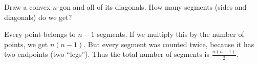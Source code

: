 \begin{exl}
Draw a convex $n$-gon and all of its diagonals.
How many segments (sides and diagonals) do we get?

Every point belongs to $n-1$ segments.
If we multiply this by the number of points, we get $n(n-1)$.
But every segment was counted twice, because it has two endpoints (two ``legs'').
Thus the total number of segments is $\frac{n(n-1)}2$.
\end{exl}